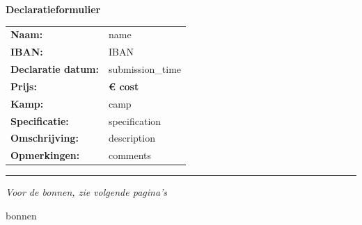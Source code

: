 \documentclass{article}
\begin{document}
\begin{center}
    {\LARGE\bfseries Declaratieformulier}\\[10pt]
    \hrulefill
\end{center}

\vspace{10pt}

\begin{tabular}{p{4cm} p{10cm}}
\textbf{Naam:} & {{ name }} \\
\textbf{IBAN:} & {{ IBAN }} \\
\textbf{Declaratie datum:} & {{ submission_time }} \\
\textbf{Prijs:} & \textbf{€{{ cost }}} \\
\textbf{Kamp:} & {{ camp }} \\
\textbf{Specificatie:} & {{ specification }} \\
\textbf{Omschrijving:} & {{ description }} \\
\textbf{Opmerkingen:} & {{ comments }} \\
\end{tabular}

\vspace{20pt}
\noindent\rule{\textwidth}{0.4pt}

\vspace{30pt}
\begin{center}
    {\large \textit{Voor de bonnen, zie volgende pagina's}}
\end{center}

\newpage

{{ bonnen }}
\end{document}
